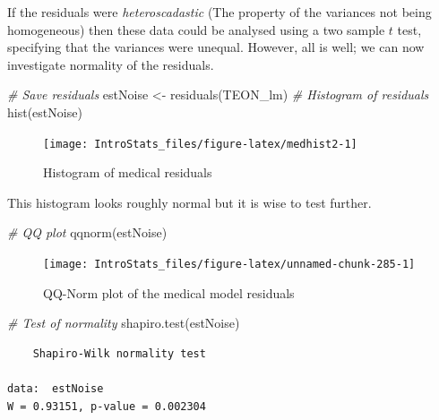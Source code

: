 \documentclass[
  oneside]{krantz}
\newenvironment{Shaded}{\begin{snugshade}}{\end{snugshade}}
\newcommand{\CommentTok}[1]{\textcolor[rgb]{0.56,0.35,0.01}{\textit{#1}}}
\newcommand{\FunctionTok}[1]{\textcolor[rgb]{0.00,0.00,0.00}{#1}}
\newcommand{\NormalTok}[1]{#1}
\newcommand{\OtherTok}[1]{\textcolor[rgb]{0.56,0.35,0.01}{#1}}
\begin{document}
If the residuals were \emph{heteroscadastic} (The property of the variances not being homogeneous) then these data could be analysed using a two sample \(t\) test, specifying that the variances were unequal. However, all is well; we can now investigate normality of the residuals.

\begin{Shaded}
\begin{Highlighting}[]
\CommentTok{\# Save residuals}
\NormalTok{estNoise }\OtherTok{\textless{}{-}} \FunctionTok{residuals}\NormalTok{(TEON\_lm) }
\CommentTok{\# Histogram of residuals }
\FunctionTok{hist}\NormalTok{(estNoise) }
\end{Highlighting}
\end{Shaded}

\begin{figure}

{\centering \texttt{[image: IntroStats\_files/figure-latex/medhist2-1]} 

}

\caption{Histogram of medical residuals}\label{fig:medhist2}
\end{figure}

This histogram looks roughly normal but it is wise to test further.

\begin{Shaded}
\begin{Highlighting}[]
\CommentTok{\# QQ plot}
\FunctionTok{qqnorm}\NormalTok{(estNoise)}
\end{Highlighting}
\end{Shaded}

\begin{figure}

{\centering \texttt{[image: IntroStats\_files/figure-latex/unnamed-chunk-285-1]} 

}

\caption{QQ-Norm plot of the medical model residuals}\label{fig:unnamed-chunk-285}
\end{figure}

\begin{Shaded}
\begin{Highlighting}[]
\CommentTok{\# Test of normality}
\FunctionTok{shapiro.test}\NormalTok{(estNoise)}
\end{Highlighting}
\end{Shaded}

\begin{verbatim}
    Shapiro-Wilk normality test

data:  estNoise
W = 0.93151, p-value = 0.002304
\end{verbatim}
\end{document}
